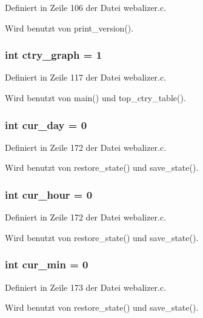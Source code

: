 Definiert in Zeile 106 der Datei webalizer.c.

Wird benutzt von print\_\-version().
\subsubsection{\setlength{\rightskip}{0pt plus 5cm}int {\bf ctry\_\-graph} = 1}\label{webalizer_8c_f1ef30cbdcfd1e369800371e296aaec2}




Definiert in Zeile 117 der Datei webalizer.c.

Wird benutzt von main() und top\_\-ctry\_\-table().
\subsubsection{\setlength{\rightskip}{0pt plus 5cm}int {\bf cur\_\-day} = 0}\label{webalizer_8c_6edfa42467177fc02002d61038a98f39}




Definiert in Zeile 172 der Datei webalizer.c.

Wird benutzt von restore\_\-state() und save\_\-state().
\subsubsection{\setlength{\rightskip}{0pt plus 5cm}int {\bf cur\_\-hour} = 0}\label{webalizer_8c_ae0bcd47798b959a96cb28082a0f151b}




Definiert in Zeile 172 der Datei webalizer.c.

Wird benutzt von restore\_\-state() und save\_\-state().
\subsubsection{\setlength{\rightskip}{0pt plus 5cm}int {\bf cur\_\-min} = 0}\label{webalizer_8c_726c08db04038ffbeffd72a3181ac519}




Definiert in Zeile 173 der Datei webalizer.c.

Wird benutzt von restore\_\-state() und save\_\-state().
